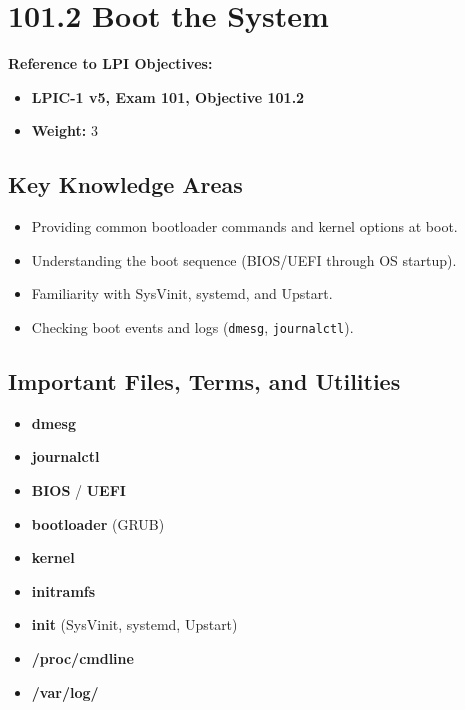 \documentclass[12pt,a4paper]{report}
\begin{document}
\newpage

\section*{101.2 Boot the System}

\textbf{Reference to LPI Objectives:}  
\begin{itemize}
    \item \textbf{LPIC-1 v5, Exam 101, Objective 101.2}
    \item \textbf{Weight:} 3
\end{itemize}

\subsection*{Key Knowledge Areas}
\begin{itemize}
    \item Providing common bootloader commands and kernel options at boot.
    \item Understanding the boot sequence (BIOS/UEFI through OS startup).
    \item Familiarity with SysVinit, systemd, and Upstart.
    \item Checking boot events and logs (\texttt{dmesg}, \texttt{journalctl}).
\end{itemize}

\subsection*{Important Files, Terms, and Utilities}
\begin{itemize}
    \item \textbf{dmesg}
    \item \textbf{journalctl}
    \item \textbf{BIOS} / \textbf{UEFI}
    \item \textbf{bootloader} (GRUB)
    \item \textbf{kernel}
    \item \textbf{initramfs}
    \item \textbf{init} (SysVinit, systemd, Upstart)
    \item \textbf{/proc/cmdline}
    \item \textbf{/var/log/}
\end{itemize}
\end{document}
